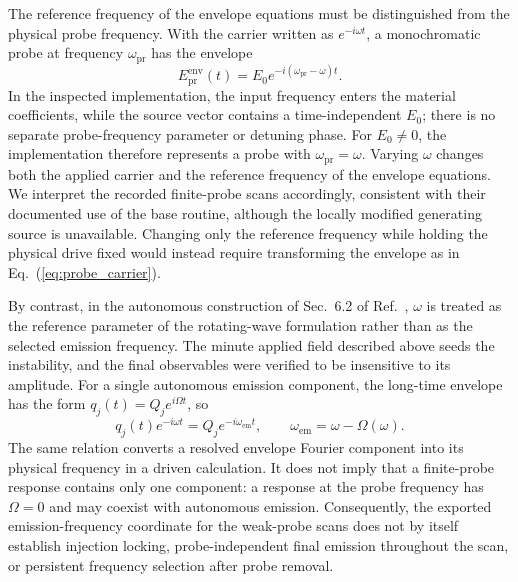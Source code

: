 \documentclass{optica-article}
\begin{document}
The reference frequency of the envelope equations must be distinguished from the physical probe frequency. With the carrier written as $e^{-i\omega t}$, a monochromatic probe at frequency $\omega_{\mathrm{pr}}$ has the envelope
\begin{equation}
E_{\mathrm{pr}}^{\mathrm{env}}(t)=E_0e^{-i(\omega_{\mathrm{pr}}-\omega)t}.
\label{eq:probe_carrier}
\end{equation}
In the inspected implementation, the input frequency enters the material coefficients, while the source vector contains a time-independent $E_0$; there is no separate probe-frequency parameter or detuning phase. For $E_0\neq0$, the implementation therefore represents a probe with $\omega_{\mathrm{pr}}=\omega$. Varying $\omega$ changes both the applied carrier and the reference frequency of the envelope equations. We interpret the recorded finite-probe scans accordingly, consistent with their documented use of the base routine, although the locally modified generating source is unavailable. Changing only the reference frequency while holding the physical drive fixed would instead require transforming the envelope as in Eq.~(\ref{eq:probe_carrier}).

By contrast, in the autonomous construction of Sec.~6.2 of Ref.~\cite{Aradian:2024}, $\omega$ is treated as the reference parameter of the rotating-wave formulation rather than as the selected emission frequency. The minute applied field described above seeds the instability, and the final observables were verified to be insensitive to its amplitude. For a single autonomous emission component, the long-time envelope has the form $q_j(t)=Q_j e^{i\Omega t}$, so
\begin{equation}
q_j(t)e^{-i\omega t}=Q_j e^{-i\omega_{\mathrm{em}}t},
\qquad \omega_{\mathrm{em}}=\omega-\Omega(\omega).
\label{eq:frequency_pulling}
\end{equation}
The same relation converts a resolved envelope Fourier component into its physical frequency in a driven calculation. It does not imply that a finite-probe response contains only one component: a response at the probe frequency has $\Omega=0$ and may coexist with autonomous emission. Consequently, the exported emission-frequency coordinate for the weak-probe scans does not by itself establish injection locking, probe-independent final emission throughout the scan, or persistent frequency selection after probe removal.
\end{document}
